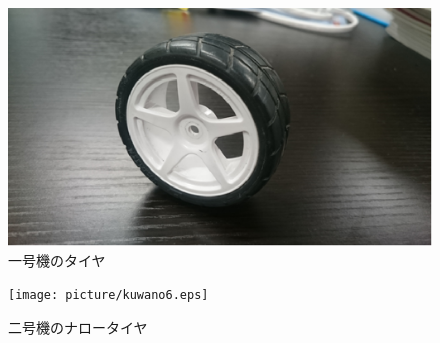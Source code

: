 \documentclass[11pt,a4j]{jarticle}
\begin{document}
\begin{figure}[t]
  \begin{center}
    \includegraphics[width=1.0\hsize]{picture/kuwano5.eps}
    \caption{一号機のタイヤ}
    \label{kuwano5}
  \end{center}
\end{figure}

\begin{figure}[t]
  \begin{center}
    \texttt{[image: picture/kuwano6.eps]}
    \caption{二号機のナロータイヤ}
    \label{kuwano6}
  \end{center}
\end{figure}
\end{document}

